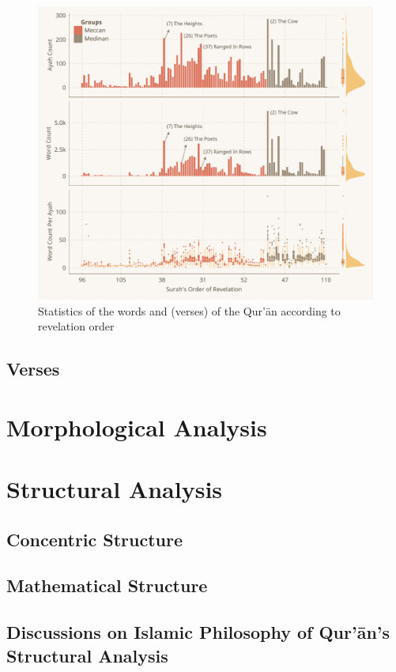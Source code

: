 \begin{figure}[!t]
    \centering
    \includegraphics[width=\textwidth]{img/plot2.pdf}
    \caption{Statistics of the words and   (verses) of the Qur'\=an according to revelation order}
    \label{fig:ch4_ayah_word_count_rev_order}
\end{figure}

\subsection{Verses}\label{sec:ch4_desc_stat_verse}
\section{Morphological Analysis}\label{sec:ch4_morphological_analysis}
\section{Structural Analysis}\label{sec:ch4_structural_analysis}
\subsection{Concentric Structure}
\subsection{Mathematical Structure}
\subsection{Discussions on Islamic Philosophy of Qur'\=an's Structural Analysis}
\newpage
